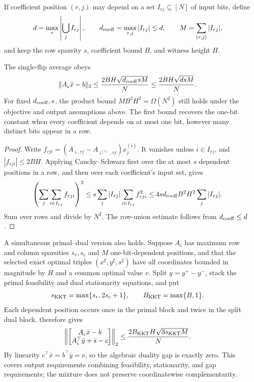 If coefficient position \((r,j)\) may depend on a set
\(I_{rj}\subseteq[N]\) of input bits, define
\[
 d=\max_r\left|\bigcup_jI_{rj}\right|,
 \qquad d_{\rm coeff}=\max_{r,j}|I_{rj}|\leq d,
 \qquad M=\sum_{(r,j)}|I_{rj}|,
\]
and keep the row sparsity \(s\), coefficient bound \(B\), and witness
height \(H\).

\begin{proposition}
\label{prop:frontier-multibit}
The single-flip average obeys
\begin{equation}
 \lVert A_{\varsigma}\bar x-b\rVert_2
 \leq\frac{2BH\sqrt{d_{\rm coeff}sM}}{N}
 \leq\frac{2BH\sqrt{dsM}}{N}.
 \label{eq:frontier-multibit}
\end{equation}
For fixed \(d_{\rm coeff},s\), the product bound
\(MB^2H^2=\Omega(N^2)\) still holds under the objective and output
assumptions above.  The first bound recovers the one-bit constant when every
coefficient depends on at most one bit, however many distinct bits appear in
a row.
\end{proposition}

\begin{proof}
Write \(f_{rji}=(A_{\varsigma,rj}-A_{\varsigma^{(i)},rj})x_j^{(i)}\).
It vanishes unless \(i\in I_{rj}\), and \(|f_{rji}|\leq2BH\).
Applying Cauchy--Schwarz first over the at most \(s\) dependent positions in
a row, and then over each coefficient's input set, gives
\[
 \left(\sum_j\sum_{i\in I_{rj}}f_{rji}\right)^2
 \leq s\sum_j |I_{rj}|\sum_{i\in I_{rj}}f_{rji}^2
 \leq4s d_{\rm coeff} B^2H^2\sum_j|I_{rj}|.
\]
Sum over rows and divide by \(N^2\).  The row-union estimate follows
from \(d_{\rm coeff}\leq d\).
\end{proof}

A simultaneous primal--dual version also holds.  Suppose \(A_\varsigma\)
has maximum row and column sparsities \(s_r,s_c\) and \(M\)
one-bit-dependent positions, and that the selected exact optimal triples
\((x^\xi,y^\xi,s^\xi)\) have all coordinates bounded in magnitude by \(H\)
and a common optimal value \(v\).  Split \(y=y^+-y^-\), stack the primal
feasibility and dual stationarity equations, and put
\[
 s_{\rm KKT}=\max\{s_r,2s_c+1\},
 \qquad B_{\rm KKT}=\max\{B,1\}.
\]
Each dependent position occurs once in the primal block and twice in the
split dual block.   therefore gives
\begin{equation}
 \left\|
 \begin{bmatrix}
 A_\varsigma\bar x-b\\
 A_\varsigma^\top\bar y+\bar s-c
 \end{bmatrix}\right\|_2
 \leq\frac{2B_{\rm KKT}H\sqrt{3s_{\rm KKT}M}}{N}.
 \label{eq:frontier-kkt-stack}
\end{equation}
By linearity \(c^\top\bar x=b^\top\bar y=v\), so the algebraic duality gap
is exactly zero.  This covers output requirements combining feasibility, stationarity,
and gap requirements; the mixture does not preserve coordinatewise
complementarity.

